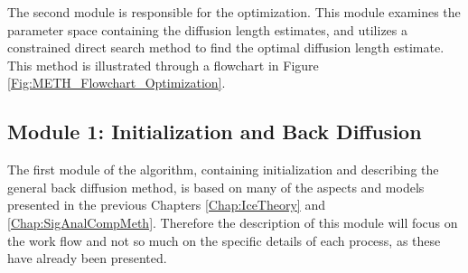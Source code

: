 \documentclass[../../CompleteThesis2/Complete_2ndDraft]{subfiles}
\begin{document}
The second module is responsible for the optimization. This module examines the parameter space containing the diffusion length estimates, and utilizes a constrained direct search method to find the optimal diffusion length estimate. This method is illustrated through a flowchart in Figure \ref{Fig:METH_Flowchart_Optimization}. 

\subsection{Module 1: Initialization and Back Diffusion}
\label{Subsec:Method_SigmaMethod_Module1}
The first module of the algorithm, containing initialization and describing the general back diffusion method, is based on many of the aspects and models presented in the previous Chapters \ref{Chap:IceTheory} and \ref{Chap:SigAnalCompMeth}. Therefore the description of this module will focus on the work flow and not so much on the specific details of each process, as these have already been presented. 
\end{document}
